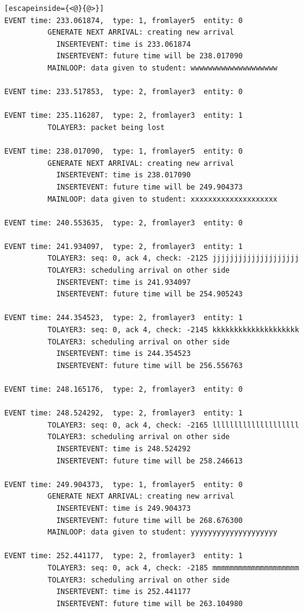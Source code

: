 \documentclass[paper=a4, fontsize=11pt]{scrartcl}
\numberwithin{equation}{section}		%
\numberwithin{figure}{section}			%
\numberwithin{table}{section}				%
\begin{document}
\begin{lstlisting}[escapeinside={<@}{@>}]
EVENT time: 233.061874,  type: 1, fromlayer5  entity: 0
          GENERATE NEXT ARRIVAL: creating new arrival
            INSERTEVENT: time is 233.061874
            INSERTEVENT: future time will be 238.017090
          MAINLOOP: data given to student: wwwwwwwwwwwwwwwwwwww

EVENT time: 233.517853,  type: 2, fromlayer3  entity: 0

EVENT time: 235.116287,  type: 2, fromlayer3  entity: 1
          TOLAYER3: packet being lost

EVENT time: 238.017090,  type: 1, fromlayer5  entity: 0
          GENERATE NEXT ARRIVAL: creating new arrival
            INSERTEVENT: time is 238.017090
            INSERTEVENT: future time will be 249.904373
          MAINLOOP: data given to student: xxxxxxxxxxxxxxxxxxxx

EVENT time: 240.553635,  type: 2, fromlayer3  entity: 0

EVENT time: 241.934097,  type: 2, fromlayer3  entity: 1
          TOLAYER3: seq: 0, ack 4, check: -2125 jjjjjjjjjjjjjjjjjjjj
          TOLAYER3: scheduling arrival on other side
            INSERTEVENT: time is 241.934097
            INSERTEVENT: future time will be 254.905243

EVENT time: 244.354523,  type: 2, fromlayer3  entity: 1
          TOLAYER3: seq: 0, ack 4, check: -2145 kkkkkkkkkkkkkkkkkkkk
          TOLAYER3: scheduling arrival on other side
            INSERTEVENT: time is 244.354523
            INSERTEVENT: future time will be 256.556763

EVENT time: 248.165176,  type: 2, fromlayer3  entity: 0

EVENT time: 248.524292,  type: 2, fromlayer3  entity: 1
          TOLAYER3: seq: 0, ack 4, check: -2165 llllllllllllllllllll
          TOLAYER3: scheduling arrival on other side
            INSERTEVENT: time is 248.524292
            INSERTEVENT: future time will be 258.246613

EVENT time: 249.904373,  type: 1, fromlayer5  entity: 0
          GENERATE NEXT ARRIVAL: creating new arrival
            INSERTEVENT: time is 249.904373
            INSERTEVENT: future time will be 268.676300
          MAINLOOP: data given to student: yyyyyyyyyyyyyyyyyyyy

EVENT time: 252.441177,  type: 2, fromlayer3  entity: 1
          TOLAYER3: seq: 0, ack 4, check: -2185 mmmmmmmmmmmmmmmmmmmm
          TOLAYER3: scheduling arrival on other side
            INSERTEVENT: time is 252.441177
            INSERTEVENT: future time will be 263.104980


\end{lstlisting}
\end{document}
